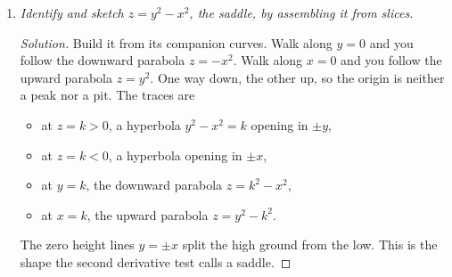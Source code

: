 \documentclass[12pt]{article}
\newenvironment{solution}
  {\renewcommand\qedsymbol{$\blacksquare$}\begin{proof}[Solution]}
  {\end{proof}}
\begin{document}
\begin{enumerate}
\begin{enumerate}
\begin{solution}
    \begin{center}
    \end{center}
    \end{solution}

    \item \textit{Identify and sketch $z=y^2-x^2$, the saddle, by assembling it from slices.}

    \begin{solution}
    Build it from its companion curves. Walk along $y=0$ and you follow the downward parabola $z=-x^2$. Walk along $x=0$ and you follow the upward parabola $z=y^2$. One way down, the other up, so the origin is neither a peak nor a pit. The traces are
    \begin{itemize}\itemsep1pt
      \item at $z=k>0$, a hyperbola $y^2-x^2=k$ opening in $\pm y$,
      \item at $z=k<0$, a hyperbola opening in $\pm x$,
      \item at $y=k$, the downward parabola $z=k^2-x^2$,
      \item at $x=k$, the upward parabola $z=y^2-k^2$.
    \end{itemize}
    The zero height lines $y=\pm x$ split the high ground from the low. This is the shape the second derivative test calls a saddle.


\end{solution}
\end{enumerate}
\end{enumerate}
\end{document}
